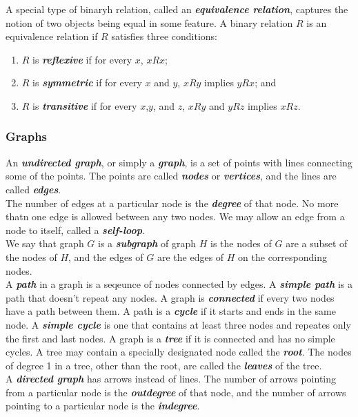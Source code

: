 \documentclass{article}
\newcommand{\define}[1]{\textbf{\textit{#1}}}
\begin{document}
A special type of binaryh relation, called an \define{equivalence relation}, captures the notion of two objects being equal in some feature. A binary relation $R$ is an equivalence relation if $R$ satisfies three conditions:

\begin{enumerate}
  \item $R$ is \define{reflexive} if for every $x$, $xRx$;
  \item $R$ is \define{symmetric} if for every $x$ and $y$, $xRy$ implies $yRx$; and 
  \item $R$ is \define{transitive} if for every $x$,$y$, and $z$, $xRy$ and $yRz$ implies $xRz$. 
\end{enumerate}

\subsubsection{Graphs}

An \define{undirected graph}, or simply a \define{graph}, is a set of points with lines connecting some of the points. The points are called \define{nodes} or \define{vertices}, and the lines are called \define{edges}. \\ 

The number of edges at a particular node is the \define{degree} of that node. No more thatn one edge is allowed between any two nodes. We may allow an edge from a node to itself, called a \define{self-loop}. \\ 

We say that graph $G$ is a \define{subgraph} of graph $H$ is the nodes of $G$ are a subset of the nodes of $H$, and the edges of $G$ are the edges of $H$ on the corresponding nodes. \\ 

A \define{path} in a graph is a seqeunce of nodes connected by edges. A \define{simple path} is a path that doesn't repeat any nodes. A graph is \define{connected} if every two nodes have a path between them. A path is a \define{cycle} if it starts and ends in the same node. A \define{simple cycle} is one that contains at least three nodes and repeates only the first and last nodes. A graph is a \define{tree} if it is connected and has no simple cycles. A tree may contain a specially designated node called the \define{root}. The nodes of degree 1 in a tree, other than the root, are called the \define{leaves} of the tree. \\ 

A \define{directed graph} has arrows instead of lines. The number of arrows pointing from a particular node is the \define{outdegree} of that node, and the number of arrows pointing to a particular node is the \define{indegree}. \\ 
\end{document}
